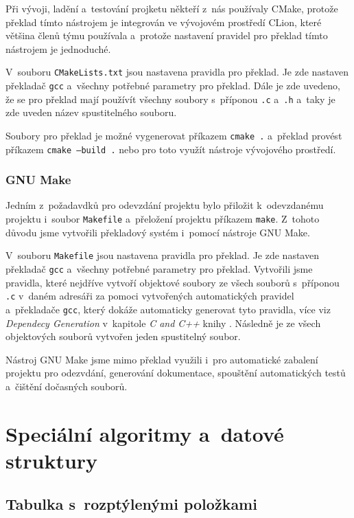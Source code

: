 \documentclass[a4paper, 11pt]{article}
\begin{document}
	Při vývoji, ladění a~testování projketu někteří z~nás používaly CMake, protože překlad tímto nástrojem
	je integrován ve vývojovém prostředí CLion, které většina členů týmu používala a~protože nastavení pravidel
	pro překlad tímto nástrojem je jednoduché.

	V~souboru \texttt{CMakeLists.txt} jsou nastavena pravidla pro překlad. Je zde nastaven překladač \texttt{gcc}
	a~všechny potřebné parametry pro překlad. Dále je zde uvedeno, že se pro překlad mají používít všechny soubory s~příponou
	\texttt{.c} a~\texttt{.h} a~taky je zde uveden název spustitelného souboru.

	Soubory pro překlad je možné vygenerovat příkazem \texttt{cmake~.} a~překlad provést příkazem \texttt{cmake~--build~.}
	nebo pro toto využít nástroje vývojového prostředí.

	\subsubsection{GNU Make}

	Jedním z~požadavdků pro odevzdání projektu bylo přiložit k~odevzdanému projektu i~soubor \texttt{Makefile} a~přeložení
	projektu příkazem \texttt{make}. Z~tohoto důvodu jsme vytvořili překladový systém i~pomocí nástroje GNU Make.

	V~souboru \texttt{Makefile} jsou nastavena pravidla pro překlad. Je zde nastaven překladač \texttt{gcc}
	a~všechny potřebné parametry pro překlad. Vytvořili jsme pravidla, které nejdříve vytvoří objektové soubory
	ze všech souborů s~příponou \texttt{.c} v~daném adresáři za pomoci vytvořených automatických pravidel a~překladače \texttt{gcc},
	který dokáže automaticky generovat tyto pravidla, více viz \emph{Dependecy Generation} v~kapitole \emph{C and C++}
	knihy \cite{Mecklenburgc2005}. Následně je ze všech objektových souborů vytvořen jeden spustitelný
	soubor.

	Nástroj GNU Make jsme mimo překlad využili i~pro automatické zabalení projektu pro odezvdání, generování dokumentace,
	spouštění automatických testů a~čištění dočasných souborů.


	\section{Speciální algoritmy a~datové struktury}

	\subsection{Tabulka s~rozptýlenými položkami}
\end{document}
